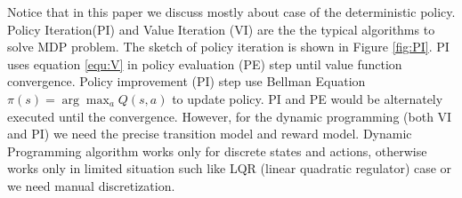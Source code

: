 Notice that in this paper we discuss mostly about case of the deterministic policy. Policy Iteration(PI) and Value Iteration (VI) are the the typical algorithms to solve MDP problem. The sketch of policy iteration is shown in Figure \ref{fig:PI}. 
PI uses equation \eqref{equ:V} in policy evaluation (PE) step until value function convergence. Policy improvement (PI) step  use Bellman Equation $\pi(s) = \arg \max_a Q(s,a)$ to update policy. PI and PE would be alternately executed until the convergence. However, for the dynamic programming (both VI and PI) we need the precise transition model and reward model. Dynamic Programming algorithm works only for discrete states and actions, otherwise works only in limited situation such like LQR (linear quadratic regulator) case or we need manual discretization.

